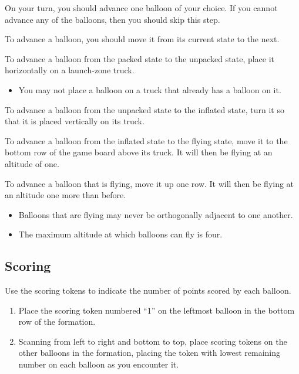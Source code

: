 \documentclass[a6paper, 11pt, parskip=half, DIV=15]{scrartcl}
\begin{document}
On your turn, you should advance one balloon of your choice. If you cannot advance any of the balloons, then you should skip this step.

\newpage
To advance a balloon, you should move it from its current state to the next.
\begin{description}[leftmargin=0pt]
  \item[Unpack:] To advance a balloon from the packed state to the unpacked state, place it horizontally on a launch-zone truck.
  \begin{itemize}
    \item You may not place a balloon on a truck that already has a balloon on it.
  \end{itemize}
  \item[Inflate:] To advance a balloon from the unpacked state to the inflated state, turn it so that it is placed vertically on its truck.
  \item[Launch:] To advance a balloon from the inflated state to the flying state, move it to the bottom row of the game board above its truck. It will then be flying at an altitude of one.
  \item[Ascend:] To advance a balloon that is flying, move it up one row. It will then be flying at an altitude one more than before.
  \begin{itemize}
    \item Balloons that are flying may never be orthogonally adjacent to one another.%
    \item The maximum altitude at which balloons can fly is four.
  \end{itemize}
\end{description}

\newpage
\enlargethispage{1.75\baselineskip}
\subsection*{Scoring}

Use the scoring tokens to indicate the number of points scored by each balloon.
\begin{enumerate}
  \item Place the scoring token numbered ``1'' on the leftmost balloon in the bottom row of the formation.
  \item Scanning from left to right and bottom to top, place scoring tokens on the other balloons in the formation, placing the token with lowest remaining number on each balloon as you encounter it.
\end{enumerate}
\end{document}
